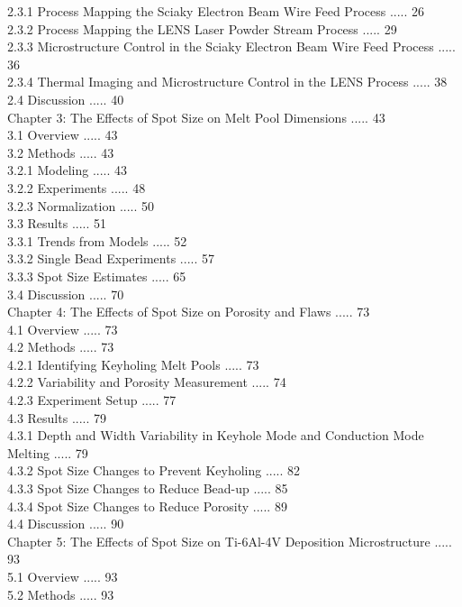 \documentclass[10pt]{article}
\begin{document}
2.3.1 Process Mapping the Sciaky Electron Beam Wire Feed Process ..... 26\\
2.3.2 Process Mapping the LENS Laser Powder Stream Process ..... 29\\
2.3.3 Microstructure Control in the Sciaky Electron Beam Wire Feed Process ..... 36\\
2.3.4 Thermal Imaging and Microstructure Control in the LENS Process ..... 38\\
2.4 Discussion ..... 40\\
Chapter 3: The Effects of Spot Size on Melt Pool Dimensions ..... 43\\
3.1 Overview ..... 43\\
3.2 Methods ..... 43\\
3.2.1 Modeling ..... 43\\
3.2.2 Experiments ..... 48\\
3.2.3 Normalization ..... 50\\
3.3 Results ..... 51\\
3.3.1 Trends from Models ..... 52\\
3.3.2 Single Bead Experiments ..... 57\\
3.3.3 Spot Size Estimates ..... 65\\
3.4 Discussion ..... 70\\
Chapter 4: The Effects of Spot Size on Porosity and Flaws ..... 73\\
4.1 Overview ..... 73\\
4.2 Methods ..... 73\\
4.2.1 Identifying Keyholing Melt Pools ..... 73\\
4.2.2 Variability and Porosity Measurement ..... 74\\
4.2.3 Experiment Setup ..... 77\\
4.3 Results ..... 79\\
4.3.1 Depth and Width Variability in Keyhole Mode and Conduction Mode Melting ..... 79\\
4.3.2 Spot Size Changes to Prevent Keyholing ..... 82\\
4.3.3 Spot Size Changes to Reduce Bead-up ..... 85\\
4.3.4 Spot Size Changes to Reduce Porosity ..... 89\\
4.4 Discussion ..... 90\\
Chapter 5: The Effects of Spot Size on Ti-6Al-4V Deposition Microstructure ..... 93\\
5.1 Overview ..... 93\\
5.2 Methods ..... 93\\
\end{document}

